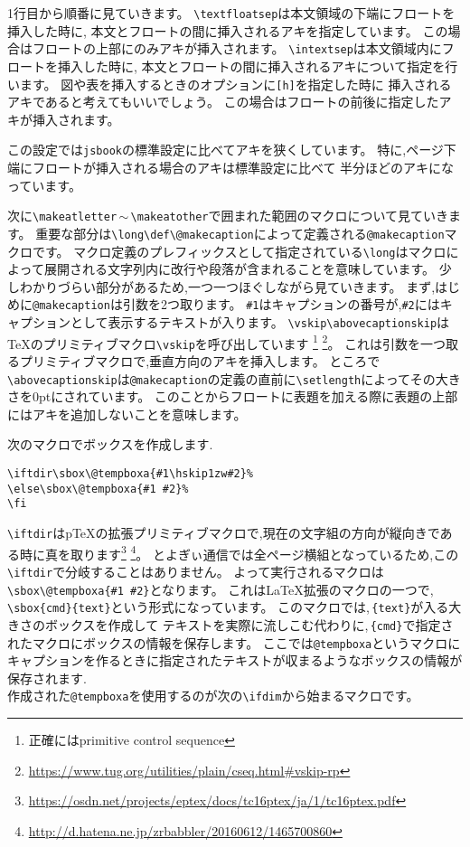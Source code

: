 1行目から順番に見ていきます。
\verb|\textfloatsep|は本文領域の下端にフロートを挿入した時に,
本文とフロートの間に挿入されるアキを指定しています。
この場合はフロートの上部にのみアキが挿入されます。
\verb|\intextsep|は本文領域内にフロートを挿入した時に,
本文とフロートの間に挿入されるアキについて指定を行います。
図や表を挿入するときのオプションに\texttt{[h]}を指定した時に
挿入されるアキであると考えてもいいでしょう。
この場合はフロートの前後に指定したアキが挿入されます。

この設定では\texttt{jsbook}の標準設定に比べてアキを狭くしています。
特に,ページ下端にフロートが挿入される場合のアキは標準設定に比べて
半分ほどのアキになっています。

次に\verb|\makeatletter|\,$\sim$\,\verb|\makeatother|で囲まれた範囲のマクロについて見ていきます。
重要な部分は\verb|\long\def\@makecaption|によって定義される\verb|@makecaption|マクロです。
マクロ定義のプレフィックスとして指定されている\verb|\long|はマクロによって展開される文字列内に改行や段落が含まれることを意味しています。
少しわかりづらい部分があるため,一つ一つほぐしながら見ていきます。
まず,はじめに\verb|@makecaption|は引数を2つ取ります。
\verb|#1|はキャプションの番号が,\verb|#2|にはキャプションとして表示するテキストが入ります。
\verb|\vskip\abovecaptionskip|は{\TeX}のプリミティブマクロ\verb|\vskip|を呼び出しています
\footnote{正確にはprimitive control sequence}
\footnote{\url{https://www.tug.org/utilities/plain/cseq.html#vskip-rp}}。
これは引数を一つ取るプリミティブマクロで,垂直方向のアキを挿入します。
ところで\verb|\abovecaptionskip|は\verb|@makecaption|の定義の直前に\verb|\setlength|によってその大きさを0ptにされています。
このことからフロートに表題を加える際に表題の上部にはアキを追加しないことを意味します。

次のマクロでボックスを作成します.
\begin{verbatim}
\iftdir\sbox\@tempboxa{#1\hskip1zw#2}%
\else\sbox\@tempboxa{#1 #2}%
\fi
\end{verbatim}%
\verb|\iftdir|は{p\TeX}の拡張プリミティブマクロで,現在の文字組の方向が縦向きである時に真を取ります\footnote{\url{https://osdn.net/projects/eptex/docs/tc16ptex/ja/1/tc16ptex.pdf}}
\footnote{\url{http://d.hatena.ne.jp/zrbabbler/20160612/1465700860}}。
とよぎぃ通信では全ページ横組となっているため,この\verb|\iftdir|で分岐することはありません。
よって実行されるマクロは\verb|\sbox\@tempboxa{#1 #2}|となります。
これは{\LaTeX}拡張のマクロの一つで,\,\verb|\sbox{cmd}{text}|という形式になっています。
このマクロでは,\,\verb|{text}|が入る大きさのボックスを作成して
テキストを実際に流しこむ代わりに,\,\verb|{cmd}|で指定されたマクロにボックスの情報を保存します。
ここでは\verb|@tempboxa|というマクロにキャプションを作るときに指定されたテキストが収まるようなボックスの情報が保存されます.\\
作成された\verb|@tempboxa|を使用するのが次の\verb|\ifdim|から始まるマクロです。

